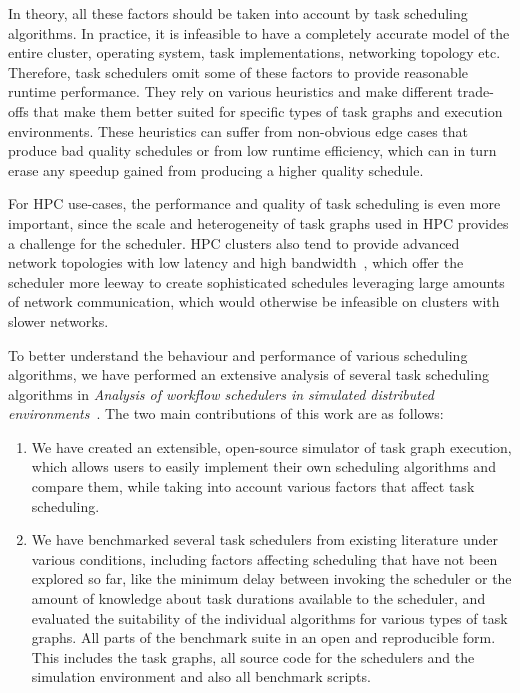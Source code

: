 In theory, all these factors should be taken into account by task scheduling algorithms. In
practice, it is infeasible to have a completely accurate model of the entire cluster, operating
system, task implementations, networking topology etc. Therefore, task schedulers omit some of
these factors to provide reasonable runtime performance. They rely on various heuristics and make
different trade-offs that make them better suited for specific types of task graphs and execution
environments. These heuristics can suffer from non-obvious edge cases that produce bad quality
schedules or from low runtime efficiency, which can in turn erase any speedup gained from producing
a higher quality schedule.

For HPC use-cases, the performance and quality of task scheduling is even more important, since the
scale and heterogeneity of task graphs used in HPC provides a challenge for the scheduler. HPC
clusters also tend to provide advanced network topologies with low latency and high
bandwidth~\cite{dragonfly,slimfly}, which offer the scheduler more leeway to create sophisticated
schedules leveraging large amounts of network communication, which would otherwise be infeasible on
clusters with slower networks.

To better understand the behaviour and performance of various scheduling algorithms, we have
performed an extensive analysis of several task scheduling algorithms in
\emph{Analysis of workflow schedulers in simulated distributed environments}~\cite{estee}. The two main contributions of this work are as
follows:
\begin{enumerate}
	\item We have created an extensible, open-source simulator of task graph execution, which allows users to
	      easily implement their own scheduling algorithms and compare them, while taking into account
	      various factors that affect task scheduling.
	\item We have benchmarked several task schedulers from existing literature under various conditions,
	      including factors affecting scheduling that have not been explored so far, like the minimum delay
	      between invoking the scheduler or the amount of knowledge about task durations available to the
	      scheduler, and evaluated the suitability of the individual algorithms for various types of task
	      graphs. All parts of the benchmark suite in an open and reproducible form. This includes the task
	      graphs, all source code for the schedulers and the simulation environment and also all benchmark
	      scripts.
\end{enumerate}

